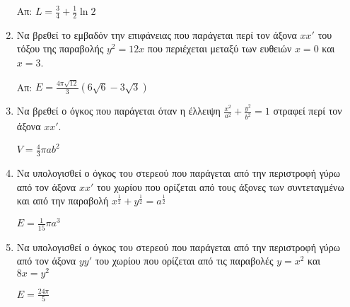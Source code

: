 \begin{enumerate}
\hfill Απ: $L=\frac{3}{4}+\frac{1}{2}\ln 2$

\item Να βρεθεί το εμβαδόν την επιφάνειας που παράγεται περί τον άξονα $xx'$ του τόξου της παραβολής $y^2=12x$ που περιέχεται μεταξύ των ευθειών $x=0$ και $x=3$.

\hfill Απ: $E=\frac{4\pi\sqrt{12}}{3}(6\sqrt{6}-3\sqrt{3})$

\item Να βρεθεί ο όγκος που παράγεται όταν η έλλειψη $\frac{x^2}{a^2}+\frac{y^2}{b^2}=1$ στραφεί περί τον άξονα $xx'$.

\hfill $V=\frac{4}{3}\pi a b^2$

\item Να υπολογισθεί ο όγκος του στερεού που παράγεται από την περιστροφή γύρω από τον άξονα $xx'$ του χωρίου που ορίζεται από τους άξονες των συντεταγμένω και από την παραβολή $x^{\frac{1}{2}}+y^{\frac{1}{2}}=a^{\frac{1}{2}}$

\hfill $E=\frac{1}{15}\pi a^3$

\item Να υπολογισθεί ο όγκος του στερεού που παράγεται από την περιστροφή γύρω από τον άξονα $yy'$ του χωρίου που ορίζεται από τις παραβολές $y=x^2$ και $8x=y^2$

\hfill $E=\frac{24\pi}{5}$

\end{enumerate}




